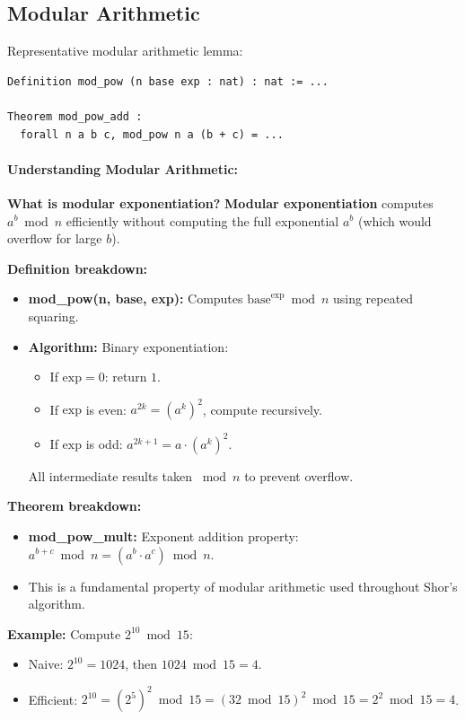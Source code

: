 \subsection{Modular Arithmetic}

Representative modular arithmetic lemma:
\begin{lstlisting}
Definition mod_pow (n base exp : nat) : nat := ...

Theorem mod_pow_add :
  forall n a b c, mod_pow n a (b + c) = ...
\end{lstlisting}

\paragraph{Understanding Modular Arithmetic:}

\textbf{What is modular exponentiation?} \textbf{Modular exponentiation} computes $a^b \bmod n$ efficiently without computing the full exponential $a^b$ (which would overflow for large $b$).

\textbf{Definition breakdown:}
\begin{itemize}
    \item \textbf{mod\_pow(n, base, exp):} Computes $\text{base}^{\text{exp}} \bmod n$ using repeated squaring.
    
    \item \textbf{Algorithm:} Binary exponentiation:
    \begin{itemize}
        \item If $\text{exp} = 0$: return $1$.
        \item If $\text{exp}$ is even: $a^{2k} = (a^k)^2$, compute recursively.
        \item If $\text{exp}$ is odd: $a^{2k+1} = a \cdot (a^k)^2$.
    \end{itemize}
    All intermediate results taken $\bmod n$ to prevent overflow.
\end{itemize}

\textbf{Theorem breakdown:}
\begin{itemize}
    \item \textbf{mod\_pow\_mult:} Exponent addition property: $a^{b+c} \bmod n = (a^b \cdot a^c) \bmod n$.
    
    \item This is a fundamental property of modular arithmetic used throughout Shor's algorithm.
\end{itemize}

\textbf{Example:} Compute $2^{10} \bmod 15$:
\begin{itemize}
    \item Naive: $2^{10} = 1024$, then $1024 \bmod 15 = 4$.
    \item Efficient: $2^{10} = (2^5)^2 \bmod 15 = (32 \bmod 15)^2 \bmod 15 = 2^2 \bmod 15 = 4$.
\end{itemize}

